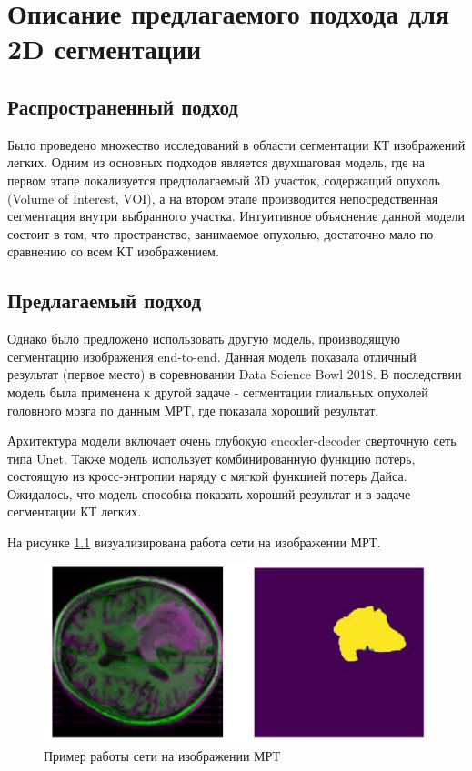 \chapter{Описание предлагаемого подхода для 2D сегментации}

\section{Распространенный подход}

Было проведено множество исследований в области сегментации КТ изображений легких. Одним из основных подходов является двухшаговая модель, где на первом этапе локализуется предполагаемый 3D участок, содержащий опухоль (Volume of Interest, VOI), а на втором этапе производится непосредственная сегментация внутри выбранного участка. Интуитивное объяснение данной модели состоит в том, что пространство, занимаемое опухолью, достаточно мало по сравнению со всем КТ изображением.

\section{Предлагаемый подход}

Однако было предложено использовать другую модель, производящую сегментацию изображения end-to-end. Данная модель показала отличный результат (первое место) в соревновании Data Science Bowl 2018. В последствии модель была применена к другой задаче - сегментации глиальных опухолей головного мозга по данным МРТ, где показала хороший результат.

Архитектура модели включает очень глубокую encoder-decoder сверточную сеть типа Unet. Также модель использует комбинированную функцию потерь, состоящую из кросс-энтропии наряду с мягкой функцией потерь Дайса. Ожидалось, что модель способна показать хороший результат и в задаче сегментации КТ легких.

На рисунке \ref{mri-sample} визуализирована работа сети на изображении МРТ.

\begin{figure}[!h]
\includegraphics[width=\linewidth]{images/mri-sample.png}
\caption{Пример работы сети на изображении МРТ}\label{mri-sample}
\centering
\end{figure}